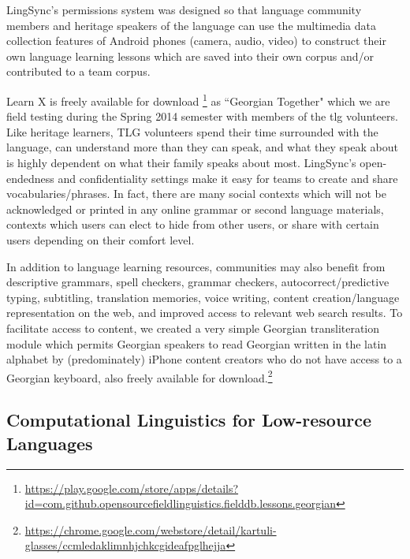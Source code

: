 \documentclass[11pt]{article}
\begin{document}
LingSync's permissions system was designed so that language community members
and heritage speakers of the language can use the multimedia data collection
features of Android phones (camera, audio, video) to construct their own
language learning lessons which are saved into their own corpus and/or
contributed to a team corpus.

Learn X is freely available for download%
\footnote{\url{https://play.google.com/store/apps/details?id=com.github.opensourcefieldlinguistics.fielddb.lessons.georgian}} %
 as ``Georgian Together" which we are field testing during the Spring 2014 semester with members of the \gls{tlg} volunteers.
Like heritage learners, TLG volunteers spend their time surrounded with the
language, can understand more than they can speak, and what they speak about is
highly dependent on what their family speaks about most. LingSync's
open-endedness and confidentiality settings make it easy for teams to create
and share vocabularies/phrases.
In fact, there are many social contexts which will not be acknowledged or printed
in any online grammar or second language materials, contexts which users can
elect to hide from other users, or share with certain users depending on their
comfort level.

In addition to language learning resources, communities may also benefit from
descriptive grammars, spell checkers, grammar checkers, autocorrect/predictive
typing, subtitling, translation memories, voice writing, content
creation/language representation on the web, and improved access to relevant
web search results. To facilitate access to content, we created a very simple
Georgian transliteration module which permits Georgian speakers to read 
 Georgian written in the latin alphabet by (predominately) iPhone content creators who
do not have access to a Georgian keyboard, also freely available for
download.\footnote{\url{https://chrome.google.com/webstore/detail/kartuli-glasses/ccmledaklimnhjchkcgideafpglhejja}}


\subsection{Computational Linguistics for Low-resource Languages}
\end{document}
